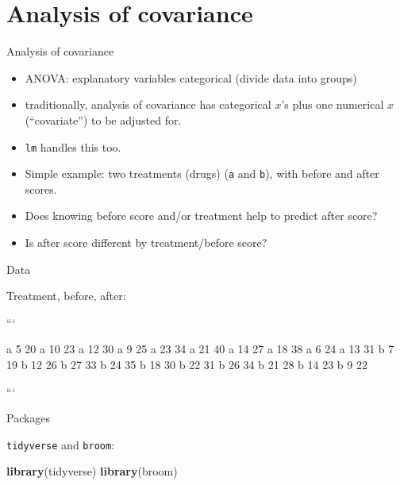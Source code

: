 \documentclass[ignorenonframetext,]{beamer}
\newenvironment{Shaded}{\begin{snugshade}}{\end{snugshade}}
\newcommand{\KeywordTok}[1]{\textcolor[rgb]{0.13,0.29,0.53}{\textbf{#1}}}
\newcommand{\NormalTok}[1]{#1}
\begin{document}
\hypertarget{analysis-of-covariance}{%
\section{Analysis of covariance}\label{analysis-of-covariance}}

\begin{frame}[fragile]{Analysis of covariance}
\protect\hypertarget{analysis-of-covariance-1}{}

\begin{itemize}
\item
  ANOVA: explanatory variables categorical (divide data into groups)
\item
  traditionally, analysis of covariance has categorical \(x\)'s plus one
  numerical \(x\) (``covariate'') to be adjusted for.
\item
  \texttt{lm} handles this too.
\item
  Simple example: two treatments (drugs) (\texttt{a} and \texttt{b}),
  with before and after scores.
\item
  Does knowing before score and/or treatment help to predict after
  score?
\item
  Is after score different by treatment/before score?
\end{itemize}

\end{frame}

\begin{frame}{Data}
\protect\hypertarget{data-1}{}

Treatment, before, after:

\begin{multicols}{2}


```

a 5 20
a 10 23
a 12 30
a 9 25
a 23 34
a 21 40
a 14 27
a 18 38
a 6 24
a 13 31
b 7 19
b 12 26
b 27 33
b 24 35
b 18 30
b 22 31
b 26 34
b 21 28
b 14 23
b 9 22

```

\end{multicols}

\end{frame}

\begin{frame}[fragile]{Packages}
\protect\hypertarget{packages-3}{}

\texttt{tidyverse} and \texttt{broom}:

\begin{Shaded}
\begin{Highlighting}[]
\KeywordTok{library}\NormalTok{(tidyverse)}
\KeywordTok{library}\NormalTok{(broom)}
\end{Highlighting}
\end{Shaded}

\end{frame}
\end{document}
